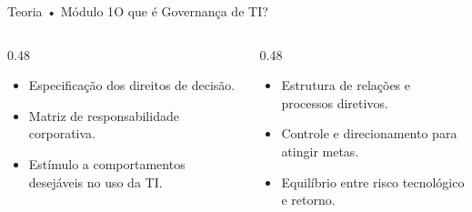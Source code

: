 \begin{senaiframe}{Teoria • Módulo 1}{O que é Governança de TI?}
  \begin{columns}[t]
    \begin{column}{0.48\textwidth}
      \begin{tcolorbox}[senaibluecard, title={Definição de Weill \& Ross (2004)}]
        \begin{itemize}
          \item Especificação dos direitos de decisão.
          \item Matriz de responsabilidade corporativa.
          \item Estímulo a comportamentos desejáveis no uso da TI.
        \end{itemize}
      \end{tcolorbox}
    \end{column}
    \begin{column}{0.48\textwidth}
      \begin{tcolorbox}[senaicard, title={Definição de Fernandes \& Abreu}]
        \begin{itemize}
          \item Estrutura de relações e processos diretivos.
          \item Controle e direcionamento para atingir metas.
          \item Equilíbrio entre risco tecnológico e retorno.
        \end{itemize}
      \end{tcolorbox}
    \end{column}
  \end{columns}
\end{senaiframe}

